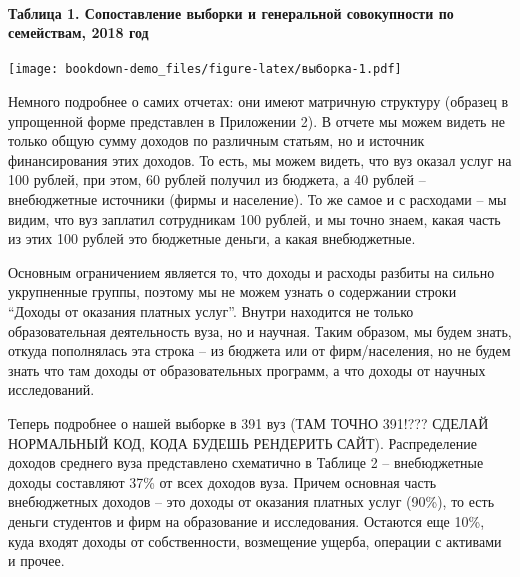 \documentclass[]{book}
\let\oldparagraph\paragraph
\renewcommand{\paragraph}[1]{\oldparagraph{#1}\mbox{}}
\begin{document}
\hypertarget{ux442ux430ux431ux43bux438ux446ux430-1.-ux441ux43eux43fux43eux441ux442ux430ux432ux43bux435ux43dux438ux435-ux432ux44bux431ux43eux440ux43aux438-ux438-ux433ux435ux43dux435ux440ux430ux43bux44cux43dux43eux439-ux441ux43eux432ux43eux43aux443ux43fux43dux43eux441ux442ux438-ux43fux43e-ux441ux435ux43cux435ux439ux441ux442ux432ux430ux43c-2018-ux433ux43eux434}{%
\paragraph{Таблица 1. Сопоставление выборки и генеральной совокупности по семействам, 2018 год}\label{ux442ux430ux431ux43bux438ux446ux430-1.-ux441ux43eux43fux43eux441ux442ux430ux432ux43bux435ux43dux438ux435-ux432ux44bux431ux43eux440ux43aux438-ux438-ux433ux435ux43dux435ux440ux430ux43bux44cux43dux43eux439-ux441ux43eux432ux43eux43aux443ux43fux43dux43eux441ux442ux438-ux43fux43e-ux441ux435ux43cux435ux439ux441ux442ux432ux430ux43c-2018-ux433ux43eux434}}

\texttt{[image: bookdown-demo\_files/figure-latex/выборка-1.pdf]}

Немного подробнее о самих отчетах: они имеют матричную структуру (образец в упрощенной форме представлен в Приложении 2). В отчете мы можем видеть не только общую сумму доходов по различным статьям, но и источник финансирования этих доходов. То есть, мы можем видеть, что вуз оказал услуг на 100 рублей, при этом, 60 рублей получил из бюджета, а 40 рублей -- внебюджетные источники (фирмы и население). То же самое и с расходами -- мы видим, что вуз заплатил сотрудникам 100 рублей, и мы точно знаем, какая часть из этих 100 рублей это бюджетные деньги, а какая внебюджетные.

Основным ограничением является то, что доходы и расходы разбиты на сильно укрупненные группы, поэтому мы не можем узнать о содержании строки ``Доходы от оказания платных услуг''. Внутри находится не только образовательная деятельность вуза, но и научная. Таким образом, мы будем знать, откуда пополнялась эта строка -- из бюджета или от фирм/населения, но не будем знать что там доходы от образовательных программ, а что доходы от научных исследований.

Теперь подробнее о нашей выборке в 391 вуз (ТАМ ТОЧНО 391!??? СДЕЛАЙ НОРМАЛЬНЫЙ КОД, КОДА БУДЕШЬ РЕНДЕРИТЬ САЙТ). Распределение доходов среднего вуза представлено схематично в Таблице 2 -- внебюджетные доходы составляют 37\% от всех доходов вуза. Причем основная часть внебюджетных доходов -- это доходы от оказания платных услуг (90\%), то есть деньги студентов и фирм на образование и исследования. Остаются еще 10\%, куда входят доходы от собственности, возмещение ущерба, операции с активами и прочее.
\end{document}
